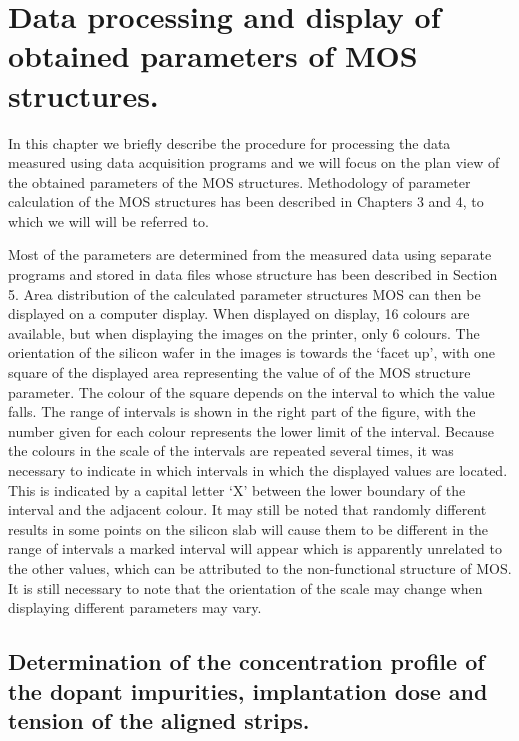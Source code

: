 
\chapter{Data processing and display of obtained parameters of MOS structures.}\label{Chapter6}

In this chapter we briefly describe the procedure for processing the
data measured using data acquisition programs and we will focus on the
plan view of the obtained parameters of the MOS
structures. Methodology of parameter calculation of the MOS structures
has been described in Chapters 3 and 4, to which we will will be
referred to.

Most of the parameters are determined from the measured data using
separate programs and stored in data files whose structure has been
described in Section 5. Area distribution of the calculated parameter
structures MOS can then be displayed on a computer display. When
displayed on display, 16 colours are available, but when displaying
the images on the printer, only 6 colours. The orientation of the
silicon wafer in the images is towards the `facet up', with one square
of the displayed area representing the value of of the MOS structure
parameter. The colour of the square depends on the interval to which
the value falls. The range of intervals is shown in the right part of
the figure, with the number given for each colour represents the lower
limit of the interval. Because the colours in the scale of the
intervals are repeated several times, it was necessary to indicate in
which intervals in which the displayed values are located. This is
indicated by a capital letter `X' between the lower boundary of the
interval and the adjacent colour. It may still be noted that randomly
different results in some points on the silicon slab will cause them
to be different in the range of intervals a marked interval will
appear which is apparently unrelated to the other values, which can be
attributed to the non-functional structure of MOS\@. It is still
necessary to note that the orientation of the scale may change when
displaying different parameters may vary.

\section{Determination of the concentration profile of the dopant impurities, implantation dose and tension of the aligned strips.}\label{sec:6.1}

